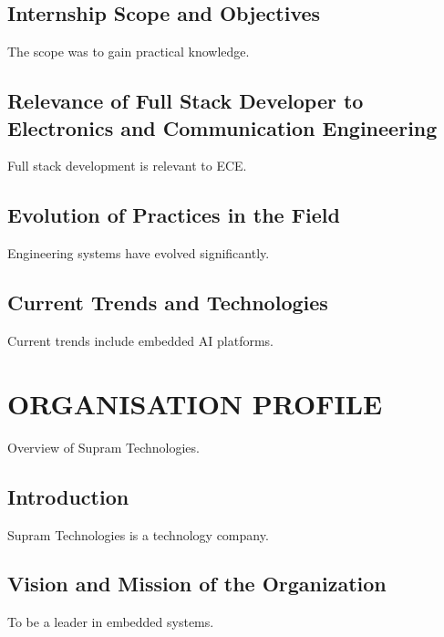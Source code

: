 \documentclass[12pt,a4paper]{report}
\begin{document}
\section{Internship Scope and Objectives}

The scope was to gain practical knowledge.


\section{Relevance of Full Stack Developer to Electronics and Communication Engineering}

Full stack development is relevant to ECE.


\section{Evolution of Practices in the Field}

Engineering systems have evolved significantly.


\section{Current Trends and Technologies}

Current trends include embedded AI platforms.




\chapter{ORGANISATION PROFILE}
\label{ch:org}


Overview of Supram Technologies.


\section{Introduction}

Supram Technologies is a technology company.




\section{Vision and Mission of the Organization}

To be a leader in embedded systems.
\end{document}

